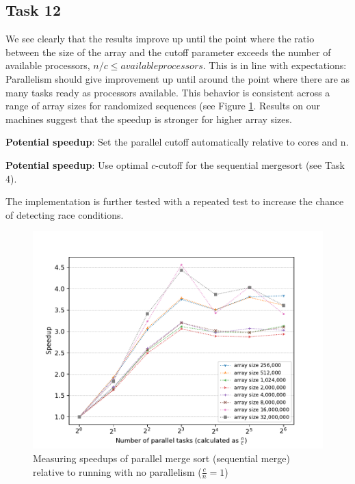\documentclass[11pt, a4paper]{article}
\begin{document}
\subsection{Task 12}

We see clearly that the results improve up until the point where the ratio between
the size of the array and the cutoff parameter exceeds the number of available processors,
$n / c \leq available processors$.
This is in line with expectations: Parallelism should give improvement up until around the point where there are as many tasks ready as processors available.
This behavior is consistent across a range of array sizes for randomized sequences (see Figure \ref{fig:t12p1}.
Results on our machines suggest that the speedup is stronger for higher array sizes.

\textbf{Potential speedup}: Set the parallel cutoff automatically relative to cores and n.

\textbf{Potential speedup}: Use optimal $c$-cutoff for the sequential mergesort (see Task 4).

The implementation is further tested with a repeated test to increase the chance of detecting race conditions.

\begin{figure}[h]
  \begin{center}
    \includegraphics[width=\textwidth]{plot/t12p1.pdf}
    \caption{Measuring speedups of parallel merge sort (sequential merge) relative to running with no parallelism ($\frac{c}{n} = 1$)}
    \label{fig:t12p1}
  \end{center}
\end{figure}
\end{document}
